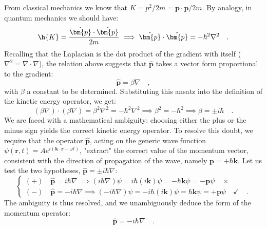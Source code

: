From classical mechanics we know that $K = p^2/2m = \bm{p}\cdot\bm{p}/{2m}$. By analogy, in quantum mechanics we should have:
\begin{equation*}
    \h{K} = \frac{\hat{\bm{p}} \cdot \hat{\bm{p}}}{2m} \implies \hat{\bm{p}} \cdot \hat{\bm{p}} = -\hbar^2\nabla^2 \quad.
\end{equation*}
Recalling that the Laplacian is the dot product of the gradient with itself ($\nabla^2 = \nabla \cdot \nabla$), the relation above suggests that $\hat{\bm{p}}$ takes a vector form proportional to the gradient:
\begin{equation*}
    \hat{\bm{p}} = \beta \nabla \quad,
\end{equation*}
with $\beta$ a constant to be determined. Substituting this ansatz into the definition of the kinetic energy operator, we get:
\begin{equation*}
    (\beta\nabla) \cdot (\beta\nabla) = \beta^2\nabla^2 = -\hbar^2\nabla^2 \implies \beta^2 = -\hbar^2 \implies \beta = \pm i\hbar \quad.
\end{equation*}
We are faced with a mathematical ambiguity: choosing either the plus or the minus sign yields the correct kinetic energy operator. To resolve this doubt, we require that the operator $\hat{\bm{p}}$, acting on the generic wave function $\psi(\bm{r},t) = A e^{i(\bm{k}\cdot\bm{r} - \omega t)}$, "extract" the correct value of the momentum vector, consistent with the direction of propagation of the wave, namely $\bm{p} = +\hbar\bm{k}$. Let us test the two hypotheses, $\hat{\bm{p}} = \pm i\hbar\nabla$:
\[
\begin{cases}
    (+) \quad \hat{\bm{p}} = i\hbar\nabla \implies (i\hbar\nabla) \psi = i\hbar (i\bm{k}) \psi = -\hbar\bm{k}\psi = -\bm{p}\psi \quad  \ensuremath{\times}\\
    (-) \quad \hat{\bm{p}} = -i\hbar\nabla \implies (-i\hbar\nabla) \psi = -i\hbar (i\bm{k}) \psi = \hbar\bm{k}\psi = +\bm{p}\psi \quad \ensuremath{\checkmark} \quad .
\end{cases}
\]
The ambiguity is thus resolved, and we unambiguously deduce the form of the momentum operator:
\begin{equation}
    {\hat{\bm{p}} = -i\hbar\nabla} \quad.
    \label{eq:operatore_p}
\end{equation}

